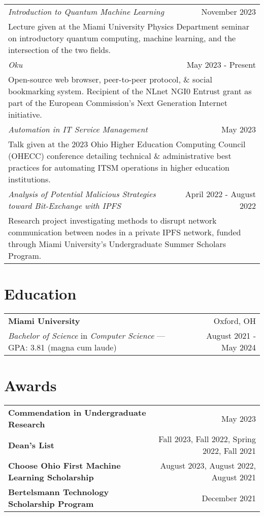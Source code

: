 \documentclass[letterpaper,10pt]{article} %
\begin{document}
\scriptsize{
\begin{tabular*}{\linewidth}{@{\extracolsep{\fill}} lr }
\emph{Introduction to Quantum Machine Learning} & November 2023\\
\multicolumn{2}{p{\linewidth}}{Lecture given at the Miami University Physics Department seminar on introductory quantum computing, machine learning, and the intersection of the two fields.}\\
\emph{Oku} & May 2023 - Present\\
\multicolumn{2}{p{\linewidth}}{Open-source web browser, peer-to-peer protocol, \& social bookmarking system. Recipient of the NLnet NGI0 Entrust grant as part of the European Commission's Next Generation Internet initiative.}\\
\emph{Automation in IT Service Management} & May 2023\\
\multicolumn{2}{p{\linewidth}}{Talk given at the 2023 Ohio Higher Education Computing Council (OHECC) conference detailing technical \& administrative best practices for automating ITSM operations in higher education institutions.}\\
\emph{Analysis of Potential Malicious Strategies toward Bit-Exchange with IPFS} & April 2022 - August 2022\\
\multicolumn{2}{p{\linewidth}}{Research project investigating methods to disrupt network communication between nodes in a private IPFS network, funded through Miami University's Undergraduate Summer Scholars Program.}\\
\end{tabular*}}

\section{Education}
\scriptsize{
\begin{tabular*}{\linewidth}{@{\extracolsep{\fill}} lr }
\textbf{Miami University} & Oxford, OH\\
\emph{Bachelor of Science} in \emph{Computer Science} --- GPA\@: 3.81 (magna cum laude) & August 2021 - May 2024
\end{tabular*}}

\section{Awards}

\scriptsize{
\begin{tabular*}{\linewidth}{@{\extracolsep{\fill}} lr }
\textbf{Commendation in Undergraduate Research} & May 2023\\
\textbf{Dean's List} & Fall 2023, Fall 2022, Spring 2022, Fall 2021\\
\textbf{Choose Ohio First Machine Learning Scholarship} & August 2023, August 2022, August 2021\\
\textbf{Bertelsmann Technology Scholarship Program} & December 2021
\end{tabular*}}
\end{document}
